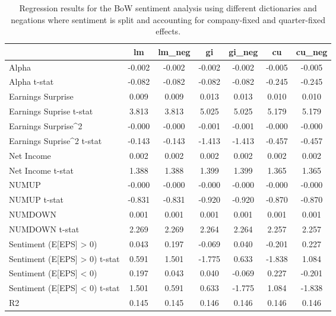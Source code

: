 \begin{table}
\caption{Regression results for the BoW sentiment analysis using different dictionaries and negations where sentiment is split and accounting for company-fixed and quarter-fixed effects.}
\label{tab:bow_regressions_split_company_and_quarter_fixed}
\begin{tabular}{lcccccc}
\toprule
 & lm & lm_neg & gi & gi_neg & cu & cu_neg \\
\midrule
Alpha & -0.002 & -0.002 & -0.002 & -0.002 & -0.005 & -0.005 \\
Alpha t-stat & -0.082 & -0.082 & -0.082 & -0.082 & -0.245 & -0.245 \\
Earnings Surprise & 0.009 & 0.009 & 0.013 & 0.013 & 0.010 & 0.010 \\
Earnings Suprise t-stat & 3.813 & 3.813 & 5.025 & 5.025 & 5.179 & 5.179 \\
Earnings Surprise^2 & -0.000 & -0.000 & -0.001 & -0.001 & -0.000 & -0.000 \\
Earnings Suprise^2 t-stat & -0.143 & -0.143 & -1.413 & -1.413 & -0.457 & -0.457 \\
Net Income & 0.002 & 0.002 & 0.002 & 0.002 & 0.002 & 0.002 \\
Net Income t-stat & 1.388 & 1.388 & 1.399 & 1.399 & 1.365 & 1.365 \\
NUMUP & -0.000 & -0.000 & -0.000 & -0.000 & -0.000 & -0.000 \\
NUMUP t-stat & -0.831 & -0.831 & -0.920 & -0.920 & -0.870 & -0.870 \\
NUMDOWN & 0.001 & 0.001 & 0.001 & 0.001 & 0.001 & 0.001 \\
NUMDOWN t-stat & 2.269 & 2.269 & 2.264 & 2.264 & 2.257 & 2.257 \\
Sentiment (E[EPS] > 0) & 0.043 & 0.197 & -0.069 & 0.040 & -0.201 & 0.227 \\
Sentiment (E[EPS] > 0) t-stat & 0.591 & 1.501 & -1.775 & 0.633 & -1.838 & 1.084 \\
Sentiment (E[EPS] < 0) & 0.197 & 0.043 & 0.040 & -0.069 & 0.227 & -0.201 \\
Sentiment (E[EPS] < 0) t-stat & 1.501 & 0.591 & 0.633 & -1.775 & 1.084 & -1.838 \\
R2 & 0.145 & 0.145 & 0.146 & 0.146 & 0.146 & 0.146 \\
\bottomrule
\end{tabular}
\end{table}
